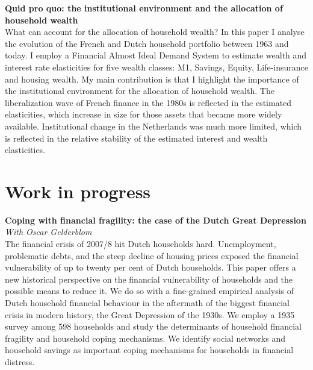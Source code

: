 \documentclass[9pt]{article}
\begin{document}
\noindent \textbf{Quid pro quo: the institutional environment and the allocation of household wealth} \\
What can account for the allocation of household wealth? In this paper I analyse the evolution of the French and Dutch household portfolio between 1963 and today. I employ a Financial Almost Ideal Demand System to estimate wealth and interest rate elasticities for five wealth classes: M1, Savings, Equity, Life-insurance and housing wealth. My main contribution is that I highlight the importance of the institutional environment for the allocation of household wealth. The liberalization wave of French finance in the 1980s is reflected in the estimated elasticities, which increase in size for those assets that became more widely available. Institutional change in the Netherlands was much more limited, which is reflected in the relative stability of the estimated interest and wealth elasticities. \vspace{-5pt}	

\vspace{-5pt}\section*{Work in progress}\vspace{-7pt}	
\noindent \textbf{Coping with financial fragility: the case of the Dutch Great Depression} \\
\noindent\textit{With Oscar Gelderblom} \\
The financial crisis of 2007/8 hit Dutch households hard. Unemployment, problematic debts, and the steep decline of housing prices exposed the financial vulnerability of up to twenty per cent of Dutch households. This paper offers a new historical perspective on the financial vulnerability of households and the possible means to reduce it. We do so with a fine-grained empirical analysis of Dutch household financial behaviour in the aftermath of the biggest financial crisis in modern history, the Great Depression of the 1930s. We employ a 1935 survey among 598 households and study the determinants of household financial fragility and household coping mechanisms. We identify social networks and household savings as important coping mechanisms for households in financial distress.\\ \vspace{-5pt}	
\end{document}
